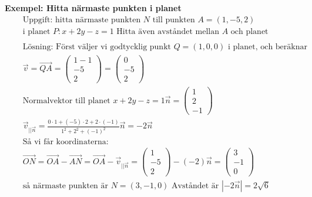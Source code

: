 \textbf{Exempel: Hitta närmaste punkten i planet} %
\begin{align*}
  &\quad  \text{Uppgift: hitta närmaste punkten $N$ till punkten } A = (1,-5,2) \\
  &\quad  \text{i planet } P: x+2y-z=1 \text{ Hitta även avståndet mellan $A$ och planet} \\
  &\quad  \\
  &\quad  \text{Lösning: Först väljer vi godtycklig punkt } Q=(1,0,0)
  \text{ i planet, och beräknar} \\
  &\quad  \vec{v}=\overrightarrow{QA} =
  \begin{pmatrix} 1-1 \\ -5 \\ 2 \end{pmatrix} =
  \begin{pmatrix} 0 \\ -5 \\ 2 \end{pmatrix} \\
  &\quad  \text{Normalvektor till planet } x+2y-z=1
  \vec{n} = \begin{pmatrix} 1 \\ 2 \\ -1 \end{pmatrix} \\
  &\quad  \vec{v}_{||\vec{n}} = \frac{0\cdot{1}+(-5)\cdot{2}+2\cdot{(-1)}}{1^2+2^2+{(-1)}^2}\vec{n}
  = -2\vec{n} \\
  &\quad  \text{Så vi får koordinaterna: } \\
  &\quad  \overrightarrow{ON} = \overrightarrow{OA} - \overrightarrow{AN}
  = \overrightarrow{OA}-\vec{v}_{||\vec{n}} =
  \begin{pmatrix} 1 \\ -5 \\ 2 \end{pmatrix} - (-2)\vec{n} =
  \begin{pmatrix} 3 \\ -1 \\ 0 \end{pmatrix} \\
  &\quad  \text{så närmaste punkten är $N = (3,-1,0)$ Avståndet är } |-2\vec{n}| = 2\sqrt{6} \\
\end{align*}

